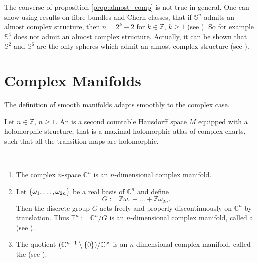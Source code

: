 \begin{remark}
The converse of proposition \ref{prop:almost_comp} is not true in general. One can show using results on fibre bundles and Chern classes, that if $\mathbb{S}^n$ admits an almost complex structure, then $n = 2^k - 2$ for $k \in \mathbb{Z}$, $k \geq 1$ (see \cite[219]{steenrod:topology_fibre:1951}). So for example $\mathbb{S}^4$ does not admit an almost complex structure. Actually, it can be shown that $\mathbb{S}^2$ and $\mathbb{S}^6$ are the only spheres which admit an almost complex structure (see \cite[434]{borel:steenrod:1953}).
\end{remark}

\section{Complex Manifolds}
The definition of smooth manifolds adapts smoothly to the complex case.

\begin{definition}
Let $n \in \mathbb{Z}$, $n \geq 1$. An  is a second countable Hausdorff space $M$ equipped with a holomorphic structure, that is a maximal holomorphic atlas of complex charts, such that all the transition maps are holomorphic.
\end{definition}

\begin{examples}
~
\begin{enumerate}[label = \arabic*.]
\item The complex $n$-space $\mathbb{C}^n$ is an $n$-dimensional complex manifold. 
\item Let $\cbr[0]{\omega_1,\dots,\omega_{2n}}$ be a real basis of $\mathbb{C}^n$ and define
\begin{equation}
G := \mathbb{Z}\omega_1 + \dots + \mathbb{Z}\omega_{2n}.
\end{equation}
Then the discrete group $G$ acts freely and properly discontinuously on $\mathbb{C}^n$ by translation. Thus $\mathbb{T}^n := \mathbb{C}^n/G$ is an $n$-dimensional complex manifold, called a  (see \cite[206--207]{grauert:complex_manifolds:2010}). 
\item The quotient $(\mathbb{C}^{n + 1} \setminus \cbr[0]{0})/\mathbb{C}^\times$ is an $n$-dimensional complex manifold, called the  (see \cite[208--210]{grauert:complex_manifolds:2010}).
\end{enumerate}
\end{examples}

